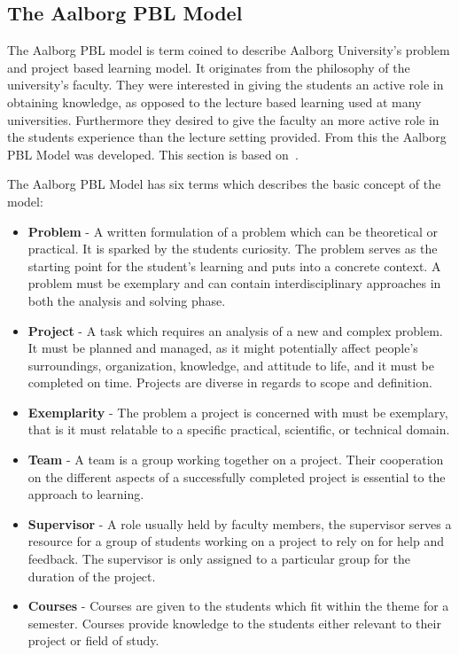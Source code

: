 \subsection{The Aalborg PBL Model}
\label{sub:aaupbl}
The Aalborg PBL model is term coined to describe Aalborg University's problem and project based learning model. It originates from the philosophy of the university's faculty. They were interested in giving the students an active role in obtaining knowledge, as opposed to the lecture based learning used at many universities. Furthermore they desired to give the faculty an more active role in the students experience than the lecture setting provided. From this the Aalborg PBL Model was developed. This section is based on~\citep{Barge10}.

The Aalborg PBL Model has six terms which describes the basic concept of the model:

\begin{itemize}
	\item \textbf{Problem} - A written formulation of a problem which can be theoretical or practical. It is sparked by the students curiosity. The problem serves as the starting point for the student's learning and puts into a concrete context. A problem must be exemplary and can contain interdisciplinary approaches	in both the analysis and solving phase.
	\item \textbf{Project} - A task which requires an analysis of a new and complex problem. It must be planned and managed, as it might potentially affect people's surroundings, organization, knowledge, and attitude to life, and it must be completed on time. Projects are diverse in regards to scope and definition.
	\item \textbf{Exemplarity} - The problem a project is concerned with must be exemplary, that is it must relatable to a specific practical, scientific, or technical domain.
	\item \textbf{Team} - A team is a group working together on a project. Their cooperation on the different aspects of a successfully completed project is essential to the approach to learning.
	\item \textbf{Supervisor} - A role usually held by faculty members, the supervisor serves a resource for a group of students working on a project to rely on for help and feedback. The supervisor is only assigned to a particular group for the duration of the project. 
	\item \textbf{Courses} - Courses are given to the students which fit within the theme for a semester. Courses provide knowledge to the students either relevant to their project or field of study.
\end{itemize}

